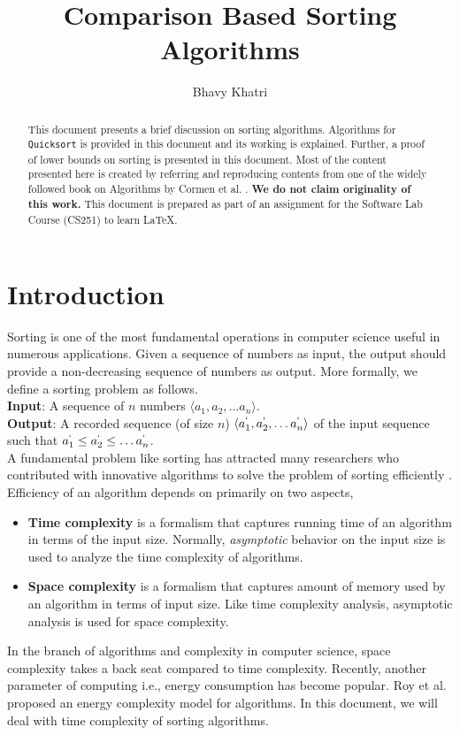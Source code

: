 \documentclass[a4paper, 11pt,twocolumn]{article}
\title{Comparison Based Sorting Algorithms}
\author{Bhavy Khatri}
\date{}
\begin{document}
\maketitle
\begin{abstract}
This document presents a brief discussion on sorting algorithms. Algorithms for \texttt{Quicksort} is provided in this document and its working is explained. Further, a proof of lower bounds on sorting is presented in this document. Most of the content presented here is created by referring and reproducing contents from one of the widely followed book on
Algorithms by Cormen et al. \cite{Cormen}. \textbf{We do not claim originality of this work.} This document is prepared as part of an assignment for the Software Lab Course (CS251) to learn \LaTeX.\\
\end{abstract}    
\section{Introduction}
Sorting is one of the most fundamental operations in computer science useful in numerous applications. Given a sequence of numbers as input, the output should provide a non-decreasing sequence of numbers as output. More formally, we define a sorting problem as follows\cite{Cormen}.\\
\textbf{Input}: A sequence of $n$ numbers $\langle a_1,a_2, \ldots a_n \rangle$.\\
\textbf{Output}: A recorded sequence (of size $n$) $\langle a_1^`, a_2^`, \ldots a_n^`\rangle$ of the input sequence such that $a_1^` \leq a_2^` \leq \ldots a_n^`$.\\
A fundamental problem like sorting has attracted many researchers who contributed with innovative algorithms to solve the problem of sorting efficiently \cite{Martin}. Efficiency of an algorithm depends on primarily on two aspects,
\begin{itemize}
\item \textbf{Time complexity} is a formalism that captures running time of an algorithm in terms of the input size. Normally, \textit{asymptotic} behavior on the input size is used to analyze the time complexity of algorithms.
\item \textbf{Space complexity} is a formalism that captures amount of memory used by an algorithm in terms of input size. Like time complexity analysis, asymptotic analysis is used for space complexity.
\end{itemize}
In the branch of algorithms and complexity in computer science, space complexity takes a back seat compared to time complexity. Recently, another parameter of computing i.e., energy consumption has become popular. Roy et al. \cite{Roy} proposed an energy complexity model for algorithms. In this document, we will deal with time complexity of sorting algorithms.
\end{document}
